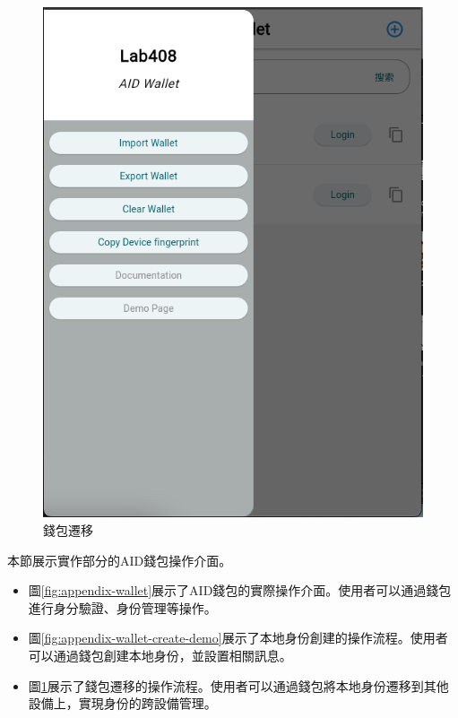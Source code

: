 \begin{figure}[p]
  \centering
  \includegraphics[width=\linewidth]{figures/wallet-drawer-demo.png}
  \caption{錢包遷移}
  \label{fig:appendix-wallet-drawer-demo}
\end{figure}
本節展示實作部分的AID錢包操作介面。
\begin{itemize}
  \item 圖\ref{fig:appendix-wallet}展示了AID錢包的實際操作介面。使用者可以通過錢包進行身分驗證、身份管理等操作。
  \item 圖\ref{fig:appendix-wallet-create-demo}展示了本地身份創建的操作流程。使用者可以通過錢包創建本地身份，並設置相關訊息。
  \item 圖\ref{fig:appendix-wallet-drawer-demo}展示了錢包遷移的操作流程。使用者可以通過錢包將本地身份遷移到其他設備上，實現身份的跨設備管理。
\end{itemize}
